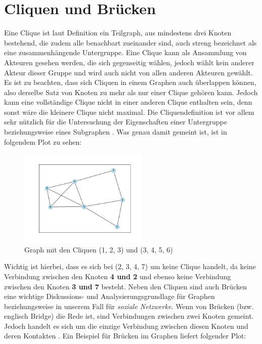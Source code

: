 \section{Cliquen und Brücken}
\label{ch:CliquenBrücken}
Eine Clique ist laut Definition ein Teilgraph, aus mindestens drei Knoten bestehend, die zudem alle benachbart zueinander sind, auch streng bezeichnet als eine zusammenhängende Untergruppe. Eine Clique kann als Ansammlung von Akteuren gesehen werden, die sich gegenseitig wählen, jedoch wählt kein anderer Akteur dieser Gruppe und wird auch nicht von allen anderen Akteuren gewählt. Es ist zu beachten, dass sich Cliquen in einem Graphen auch überlappen können, also derselbe Satz von Knoten zu mehr als nur einer Clique gehören kann. Jedoch kann eine vollständige Clique nicht in einer anderen Clique enthalten sein, denn sonst wäre die kleinere Clique nicht maximal. Die Cliquendefinition ist vor allem sehr nützlich für die Untersuchung der Eigenschaften einer Untergruppe beziehungsweise eines Subgraphen \cite{wasserman1994social}. Was genau damit gemeint ist, ist in folgendem Plot zu sehen: 
\FloatBarrier
\begin{figure}[htb!]
    \centering
    \includegraphics[width=0.55\textwidth]{Graphics/Clique.png}
    \caption{Graph mit den Cliquen (1, 2, 3) und (3, 4, 5, 6)}
    \label{fig:Clique}
\end{figure}

\newpage
Wichtig ist hierbei, dass es sich bei (2, 3, 4, 7) um keine Clique handelt, da keine Verbindung zwischen den Knoten \textbf{4 und 2} und ebenso keine Verbindung zwischen den Knoten \textbf{3 und 7} besteht.
Neben den Cliquen sind auch Brücken eine wichtige Diskussions- und Analysierungsgrundlage für Graphen beziehungsweise in unserem Fall für \textit{soziale Netzwerke}. Wenn von Brücken (bzw. englisch Bridge) die Rede ist, sind Verbindungen zwischen zwei Knoten gemeint. Jedoch handelt es sich um die einzige Verbindung zwischen diesen Knoten und deren Kontakten \cite{bridge}. Ein Beispiel für Brücken im Graphen liefert folgender Plot:

